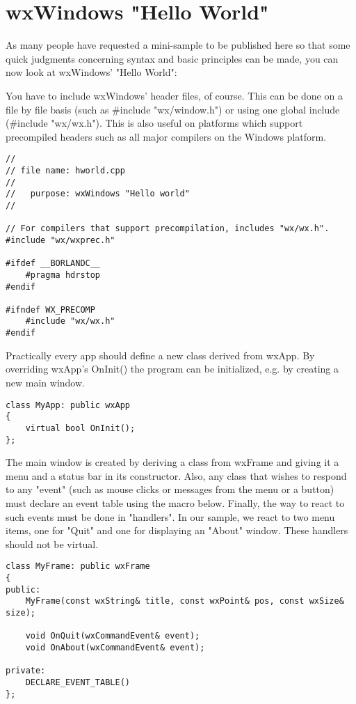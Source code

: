 \section{wxWindows "Hello World"}\label{helloworld}

As many people have requested a mini-sample to be published here
so that some quick judgments concerning syntax
and basic principles can be made, you can now look at wxWindows'
"Hello World":

You have to include wxWindows' header files, of course. This can
be done on a file by file basis (such as \#include "wx/window.h")
or using one global include (\#include "wx/wx.h"). This is
also useful on platforms which support precompiled headers such
as all major compilers on the Windows platform.

\begin{verbatim}
//
// file name: hworld.cpp
//
//   purpose: wxWindows "Hello world"
//

// For compilers that support precompilation, includes "wx/wx.h".
#include "wx/wxprec.h"

#ifdef __BORLANDC__
    #pragma hdrstop
#endif

#ifndef WX_PRECOMP
    #include "wx/wx.h"
#endif
\end{verbatim}

Practically every app should define a new class derived from wxApp.
By overriding wxApp's OnInit() the program can be initialized,
e.g. by creating a new main window. 

\begin{verbatim}
class MyApp: public wxApp
{
    virtual bool OnInit();
};
\end{verbatim}

The main window is created by deriving a class from wxFrame and 
giving it a menu and a status bar in its constructor. Also, any class
that wishes to respond to any "event" (such as mouse clicks or
messages from the menu or a button) must declare an event table 
using the macro below. Finally, the way to react to such events 
must be done in "handlers". In our sample, we react to two menu items, 
one for "Quit" and one for displaying an "About" window. These
handlers should not be virtual.

\begin{verbatim}
class MyFrame: public wxFrame
{
public:
    MyFrame(const wxString& title, const wxPoint& pos, const wxSize& size);

    void OnQuit(wxCommandEvent& event);
    void OnAbout(wxCommandEvent& event);

private:
    DECLARE_EVENT_TABLE()
};
\end{verbatim}

